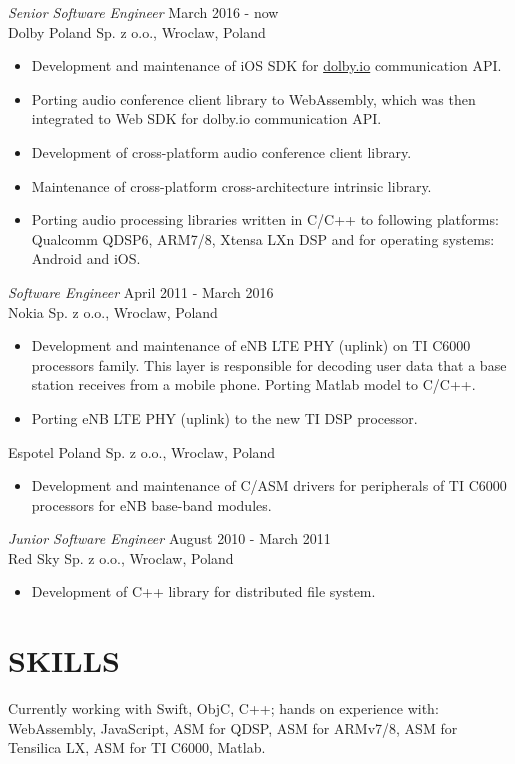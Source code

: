 \documentclass[margin, 10pt]{res} %
\begin{document}
\begin{resume}
{\sl Senior Software Engineer} \hfill March 2016 - now\\
Dolby Poland Sp. z o.o., Wroclaw, Poland

\begin{itemize} \itemsep -2pt %
\item Development and maintenance of iOS SDK for \href{https://docs.dolby.io/communications-apis/docs/overview-introduction}{dolby.io} communication API. 
\item Porting audio conference client library to WebAssembly, which was then integrated to Web SDK for dolby.io communication API.
\item Development of cross-platform audio conference client library.
\item Maintenance of cross-platform cross-architecture intrinsic library.
\item Porting audio processing libraries written in C/C++ to following platforms: Qualcomm QDSP6, ARM7/8, Xtensa LXn DSP and for operating systems: Android and iOS.
\end{itemize}

{\sl Software Engineer} \hfill April 2011 - March 2016  \\
Nokia Sp. z o.o., Wroclaw, Poland
\begin{itemize} 
\item Development and maintenance of eNB LTE PHY (uplink) on TI C6000 processors family. This layer is responsible for decoding user data that a base station receives from a mobile phone. Porting Matlab model to C/C++.
\item Porting eNB LTE PHY (uplink) to the new TI DSP processor.
\end{itemize} 
Espotel Poland Sp. z o.o., Wroclaw, Poland
\begin{itemize}
\item Development and maintenance of C/ASM drivers for peripherals of TI C6000 processors for eNB base-band modules.
\end{itemize} 


{\sl Junior Software Engineer} \hfill August 2010 - March 2011\\
Red Sky Sp. z o.o., Wroclaw, Poland

\begin{itemize} \itemsep -2pt %
\item Development of C++ library for distributed file system.

\end{itemize}

\section{SKILLS} 

Currently working with Swift, ObjC, C++; hands on experience with: WebAssembly, JavaScript, ASM for QDSP, ASM for ARMv7/8, ASM for Tensilica LX, ASM for TI C6000, Matlab.

\end{resume}
\end{document}
